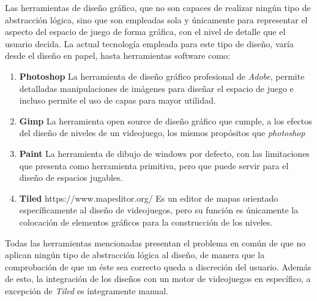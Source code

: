 Las herramientas de diseño gráfico, que no son capaces de realizar ningún tipo de abstracción lógica, sino que son empleadas sola y únicamente para representar el aspecto del espacio de juego de forma gráfica, con el nivel de detalle que el usuario decida.
La actual tecnología empleada para este tipo de diseño, varía desde el diseño en papel, hasta herramientas software como:
\begin{enumerate}
	\item \textbf{Photoshop} La herramienta de diseño gráfico profesional de \textit{Adobe}, permite detalladas manipulaciones de imágenes para diseñar el espacio de juego e incluso permite el uso de capas para mayor utilidad.
	\item \textbf{Gimp} La herramienta open source de diseño gráfico que cumple, a los efectos del diseño de niveles de un videojuego, los mismos propósitos que \textit{photoshop}
	\item \textbf{Paint} La herramienta de dibujo de windows por defecto, con las limitaciones que presenta como herramienta primitiva, pero que puede servir para el diseño de espacios jugables.
	\item \textbf{Tiled} https://www.mapeditor.org/ Es un editor de mapas orientado específicamente al diseño de videojuegos, pero su función es únicamente la colocación de elementos gráficos para la construcción de los niveles.
\end{enumerate}
Todas las herramientas mencionadas presentan el problema en común de que no aplican ningún tipo de abstracción lógica al diseño, de manera que la comprobación de que un éste sea correcto queda a discreción del usuario.
Además de esto, la integración de los diseños con un motor de videojuegos en específico, a excepción de \textit{Tiled} es íntegramente manual.